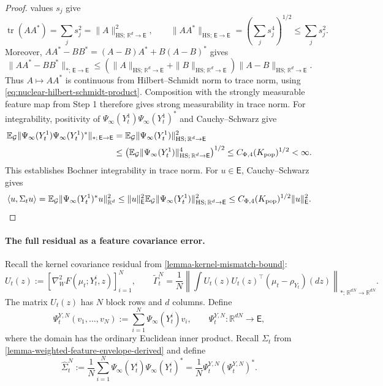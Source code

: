 \begin{proof}
values $s_j$ give
\[
 \operatorname{tr}(AA^*)=\sum_js_j^2=\|A\|_{\mathrm{HS};\,\mathbb R^d\to\mathsf E}^2,
 \qquad
 \|AA^*\|_{\mathrm{HS};\,\mathsf E\to\mathsf E}=(\sum_js_j^4)^{1/2}\le\sum_js_j^2.
\]
Moreover, $AA^*-BB^*=(A-B)A^*+B(A-B)^*$ gives
\[
 \|AA^*-BB^*\|_{*;\,\mathsf E\to\mathsf E}
 \le(\|A\|_{\mathrm{HS};\,\mathbb R^d\to\mathsf E}+\|B\|_{\mathrm{HS};\,\mathbb R^d\to\mathsf E})\|A-B\|_{\mathrm{HS};\,\mathbb R^d\to\mathsf E}.
\]
Thus $A\mapsto AA^*$ is continuous from Hilbert--Schmidt norm to trace
norm, using \eqref{eq:nuclear-hilbert-schmidt-product}.
Composition with the strongly measurable feature map from Step 1
therefore gives strong measurability in trace norm. For integrability,
positivity of $\Psi_\infty(Y_t^1)\Psi_\infty(Y_t^1)^*$ and
Cauchy--Schwarz give
\[
\begin{aligned}
 \mathbb E_{\mathcal G}
   \|\Psi_\infty(Y_t^1)\Psi_\infty(Y_t^1)^*\|_{*;\,\mathsf E\to\mathsf E}
 &=\mathbb E_{\mathcal G}\|\Psi_\infty(Y_t^1)\|_{\mathrm{HS};\,\mathbb R^d\to\mathsf E}^2\\
 &\le\bigl(\mathbb E_{\mathcal G}
                  \|\Psi_\infty(Y_t^1)\|_{\mathrm{HS};\,\mathbb R^d\to\mathsf E}^4\bigr)^{1/2}
 \le C_{\Phi,4}(K_{\rm pop})^{1/2}<\infty.
\end{aligned}
\]
This establishes Bochner integrability in trace norm.
For $u\in\mathsf E$, Cauchy--Schwarz gives
\[
 \langle u,\Sigma_tu\rangle
 =\mathbb E_{\mathcal G}\|\Psi_\infty(Y_t^1)^*u\|_{\mathbb R^d}^2
 \le\|u\|_{\mathsf E}^2\mathbb E_{\mathcal G}\|\Psi_\infty(Y_t^1)\|_{\mathrm{HS};\,\mathbb R^d\to\mathsf E}^2
 \le C_{\Phi,4}(K_{\rm pop})^{1/2}\|u\|_{\mathsf E}^2.
\]
\end{proof}

\paragraph{The full residual as a feature covariance error.}
Recall the kernel covariance residual from \cref{lemma-kernel-mismatch-bound}:
\begin{equation}
\label{eq:tilde-gamma-full-definition-weighted}
 U_t(z):=[\nabla_W^2F(\mu_t;Y_t^i,z)]_{i=1}^N,
 \qquad
 \widetilde\Gamma_t^N
 =\frac1N\left\|\int U_t(z)U_t(z)^\top
                          (\mu_t-\rho_{Y_t})(dz)\right\|_{*;\,\mathbb R^{dN}\to\mathbb R^{dN}}.
\end{equation}
The matrix $U_t(z)$ has $N$ block rows and $d$ columns. Define
\[
 \Psi_t^{Y,N}(v_1,\ldots,v_N):=\sum_{i=1}^N\Psi_\infty(Y_t^i)v_i,
 \qquad
 \Psi_t^{Y,N}:\mathbb R^{dN}\longrightarrow\mathsf E,
\]
where the domain has the ordinary Euclidean inner product. Recall $\Sigma_t$
from \cref{lemma-weighted-feature-envelope-derived} and define
\[
 \widehat\Sigma_t^N:=\frac1N\sum_{i=1}^N
       \Psi_\infty(Y_t^i)\Psi_\infty(Y_t^i)^*
       =\frac1N\Psi_t^{Y,N}(\Psi_t^{Y,N})^*.
\]

